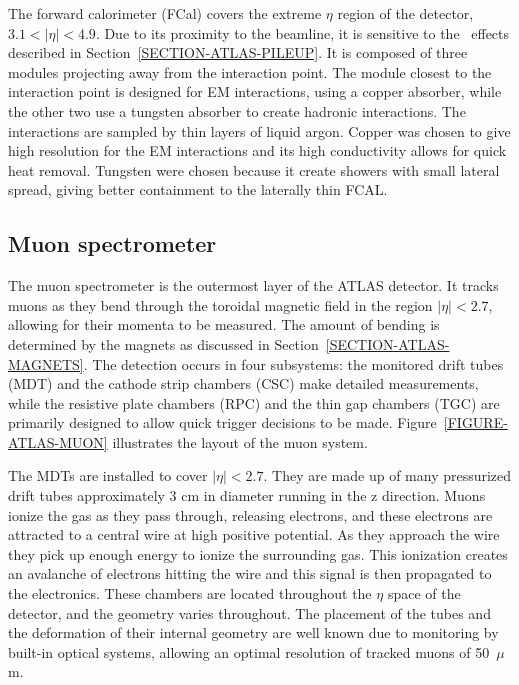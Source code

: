 The forward calorimeter (FCal) covers the extreme $\eta$ region of the detector, \mbox{$3.1 < \left|\eta\right| < 4.9$}. Due to its proximity to the beamline, it is sensitive to the \pileup\ effects described in Section~\ref{SECTION-ATLAS-PILEUP}. It is composed of three modules projecting away from the interaction point. The module closest to the interaction point is designed for EM interactions, using a copper absorber, while the other two use a tungsten absorber to create hadronic interactions. The interactions are sampled by thin layers of liquid argon. Copper was chosen to give high resolution for the EM interactions and its high conductivity allows for quick heat removal. Tungsten were chosen because it create showers with small lateral spread, giving better containment to the laterally thin FCAL.

\subsection{Muon spectrometer}
\label{SECTION-ATLAS-MUON}

The muon spectrometer is the outermost layer of the ATLAS detector. It tracks muons as they bend through the toroidal magnetic field in the region \mbox{$\left|\eta\right| < 2.7$}, allowing for their momenta to be measured. The amount of bending is determined by the magnets as discussed in Section~\ref{SECTION-ATLAS-MAGNETS}. The detection occurs in four subsystems: the monitored drift tubes (MDT) and the cathode strip chambers (CSC) make detailed measurements, while the resistive plate chambers (RPC) and the thin gap chambers (TGC) are primarily designed to allow quick trigger decisions to be made. Figure~\ref{FIGURE-ATLAS-MUON} illustrates the layout of the muon system. 


The MDTs are installed to cover \mbox{$\left|\eta\right| < 2.7$}. They are made up of many pressurized drift tubes approximately 3 cm in diameter running in the z direction. Muons ionize the gas as they pass through, releasing electrons, and these electrons are attracted to a central wire at high positive potential. As they approach the wire they pick up enough energy to ionize the surrounding gas. This ionization creates an avalanche of electrons hitting the wire and this signal is then propagated to the electronics. These chambers are located throughout the $\eta$ space of the detector, and the geometry varies throughout. The placement of the tubes and the deformation of their internal geometry are well known due to monitoring by built-in optical systems, allowing an optimal resolution of tracked muons of \mbox{50 $\mu$m}.

